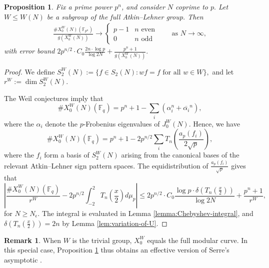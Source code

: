 \documentclass[11pt,letterpaper,reqno]{amsart}
\newtheorem{proposition}[theorem]{Proposition}
\theoremstyle{definition}
\newtheorem{remark}[theorem]{Remark}
\numberwithin{equation}{section}
\numberwithin{figure}{section}
\numberwithin{table}{section}
\begin{document}
\begin{proposition}\label{thm:asymptotic-point-count-W-quotient}
    Fix a prime power $p^n$, and consider $N$ coprime to $p.$ Let $W \leq W(N)$ be a subgroup of the full Atkin--Lehner group. Then
    \begin{align}
        \frac{\#X_0^W(N)(\mathbb F_{p^n})} 
{g(X_0^W(N))} \longrightarrow \begin{cases}
p-1 & \text{$n$ even}\\
0 & \text{$n$ odd}
\end{cases} \qquad \text{as $N \rightarrow \infty$},
    \end{align}
    with error bound $2 p^{n/2} \cdot C_0 \frac{2n \cdot \log p}{\log 2N} + \frac{p^n + 1}{g(X_0^W(N))}.$
\end{proposition}

\begin{proof}
    We define
    $S_2^W(N):=\{f\in S_2(N): wf=f\text{ for all }w\in W\},$
    and let $r^W := \dim S_2^W(N).$ 
    
    The Weil conjectures imply that
$$
\#X_0^W(N)(\mathbb F_q)
=
p^n +1-\sum_i(\alpha_i^n+\overline{\alpha_i}^n),
$$
where the $\alpha_i$ denote the $p$-Frobenius eigenvalues of $J_0^W(N)$. Hence, we have
$$
\#X_0^W(N)(\mathbb F_q)
=
p^n +1
-
2p^{n/2}
\sum_i
T_n\!\left(\frac{a_p(f_i)}{2\sqrt p}\right),
$$
where the $f_i$ form a basis of $S_2^W(N)$ arising from the canonical
bases of the relevant Atkin--Lehner sign pattern spaces. The
equidistribution of $\frac{a_p(f_i)}{\sqrt p}$ gives that
$$
\left|
\frac{\#X_0^W(N)(\mathbb F_q)}{r^W}
-
2p^{n/2}{}
\int_{-2}^2
T_n\left(\frac{x}{2}\right)d\mu_p
\right|
\leq
2p^{n/2}\cdot C_0
\frac{\log p \cdot \delta \left(T_n\left(\frac{x}{2}\right)\right)}
{\log 2N} + \frac{p^n + 1}{r^W},
$$
for $N\geq N_\epsilon$. The integral is evaluated in Lemma \ref{lemma:Chebyshev-integral}, and $\delta(T_n(\frac{x}{2})) = 2n$ by Lemma \ref{lem:variation-of-U}.
\end{proof}

\begin{remark}
    When $W$ is the trivial group, $X_0^W$ equals the full modular curve. In this special case, Proposition \ref{thm:asymptotic-point-count-W-quotient} thus obtains an effective version of Serre's asymptotic \cite[Th\'eor\`eme 9]{Ser97}.
\end{remark}
\end{document}
